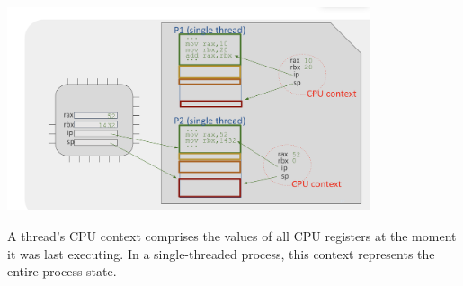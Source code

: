 \documentclass[../../compsys.tex]{subfiles}
\begin{document}
\begin{center}
    \includegraphics[width=0.8\textwidth]{chapters/L2/images/cpu_context.png}
\end{center}

\begin{definition}
A thread's CPU context comprises the values of all CPU registers at the moment it was last executing. In a single-threaded process, this context represents the entire process state.
\end{definition}
\end{document}
